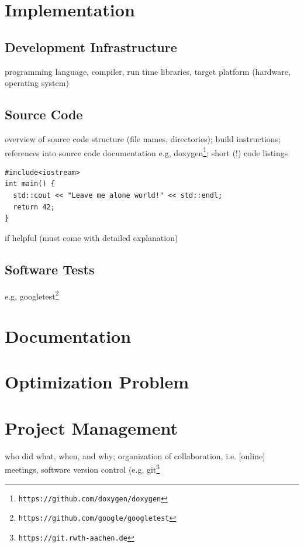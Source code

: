 \documentclass{article}
\begin{document}
\section{Implementation} \label{ch:implementation}

\subsection{Development Infrastructure}

programming language, compiler, run time libraries, target platform
(hardware, operating system)

\subsection{Source Code}

overview of source code structure (file names, directories); build instructions; references into source code documentation e.g, doxygen\footnote{\tt https://github.com/doxygen/doxygen}; short (!) code listings
\begin{lstlisting}
#include<iostream>
int main() {
  std::cout << "Leave me alone world!" << std::endl;
  return 42;
}
\end{lstlisting}
if helpful (must come with detailed explanation)

\subsection{Software Tests}

e.g, googletest\footnote{\tt https://github.com/google/googletest}

\section{Documentation}\label{ch:doc}

\section{Optimization Problem}\label{ch:optimization-problem}


\section{Project Management} \label{ch:projectmanagement}

who did what, when, and why; organization of collaboration, i.e. [online] meetings, software version control (e.g, git\footnote{\tt https://git.rwth-aachen.de}
\end{document}
